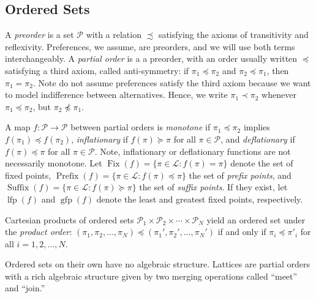 \documentclass[conference]{ieeeconf}
\renewcommand{\P}{\mathcal{P}}
\renewcommand{\L}{\mathcal{L}}
\DeclareMathOperator{\Fix}{Fix}
\DeclareMathOperator{\Pre}{Prefix}
\DeclareMathOperator{\Post}{Suffix}
\DeclareMathOperator{\lfp}{lfp}
\DeclareMathOperator{\gfp}{gfp}
\newtheorem{lemma}{Lemma}
\begin{document}
\subsection{Ordered Sets}

A \emph{preorder} is a set $\P$ with a relation $\precsim$ satisfying the axioms of transitivity and reflexivity. Preferences, we assume, are preorders, and we will use both terms interchangeably. A \emph{partial order} is a a preorder, with an order usually written $\preceq$ satisfying a third axiom, called anti-symmetry: if $\pi_1 \preceq \pi_2$ and $\pi_2 \preceq \pi_1$, then $\pi_1 = \pi_2$. Note do not assume preferences satisfy the third axiom because we want to model indifference between alternatives. Hence, we write $\pi_1 \prec \pi_2$ whenever $\pi_1 \preceq \pi_2$, but $\pi_2 \not \preceq \pi_1$.

A map $f: \P \to \P$ between partial orders is \emph{monotone} if $\pi_1 \preceq \pi_2$ implies $f(\pi_1) \preceq f(\pi_2)$, \emph{inflationary} if $f(\pi) \succeq \pi$ for all $\pi \in \P$, and \emph{deflationary} if $f(\pi) \preceq \pi$ for all $\pi \in \P$. Note, inflationary or deflationary functions are not necessarily monotone. Let $\Fix(f) = \{ \pi \in \L: f(\pi) = \pi \}$ denote the set of fixed points, $\Pre(f) = \{ \pi \in \L : f(\pi) \preceq \pi\}$ the set of \emph{prefix points}, and $\Post(f) =\{ \pi \in \L : f(\pi) \succeq \pi\}$ the set of \emph{suffix points}. If they exist, let $\lfp(f)$ and $\gfp(f)$ denote the least and greatest fixed points, respectively.

Cartesian products of ordered sets $\P_1 \times \P_2 \times \cdots \times \P_N$ yield an ordered set under the \emph{product order}: $(\pi_1, \pi_2, \dots, \pi_N) \preceq (\pi_1', \pi_2', \dots, \pi_N')$ if and only if $\pi_i \preceq \pi'_i$ for all $i = 1,2,\dots, N$. 


Ordered sets on their own have no algebraic structure. Lattices are partial orders with a rich algebraic structure given by two merging operations called ``meet'' and ``join.''
 
\end{document}
